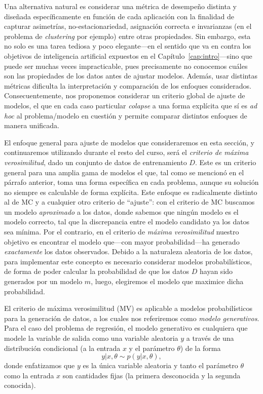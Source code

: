Una alternativa natural es considerar una métrica de desempeño distinta y diseñada específicamente en función  de cada aplicación con la finalidad de capturar asimetrías, no-estacionariedad, asignación correcta e invarianzas (en el problema de \emph{clustering} por ejemplo) entre otras propiedades. Sin embargo, esta no solo es una tarea tediosa y poco elegante---en el sentido que va en contra los objetivos de inteligencia artificial expuestos en el Capítulo~\ref{cap:intro}---sino que puede ser muchas veces impracticable, pues precisamente no conocemos cuáles son las propiedades de los datos antes de ajustar modelos. Además, usar distintas métricas dificulta la interpretación y comparación de los enfoques considerados. Consecuentemente, nos proponemos considerar un criterio global de ajuste de modelos, el que en cada caso particular \emph{colapse} a una forma explícita que sí es \emph{ad hoc} al problema/modelo en cuestión y permite comparar distintos enfoques de manera unificada. 	

El enfoque general para ajuste de modelos que consideraremos en esta sección, y continuaremos utilizando durante el resto del curso, será el \emph{criterio  de máxima verosimilitud}, dado un conjunto de datos de entrenamiento $D$. Este es un criterio general para una amplia gama de modelos el que, tal como se mencionó en el párrafo anterior, toma una  forma específica en cada problema, aunque su solución no siempre es calculable de forma explícita. Este enfoque es radicalmente distinto al de MC y a cualquier otro criterio de ``ajuste'': con el criterio de MC buscamos un modelo \emph{aproximado} a los datos, donde sabemos que ningún modelo es el modelo correcto, tal que la discrepancia entre el modelo candidato ya los datos sea mínima. Por el contrario, en el criterio de \emph{máxima verosimilitud} nuestro objetivo es encontrar el modelo que---con mayor probabilidad---ha generado \emph{exactamente} los datos observados. Debido a la naturaleza aleatoria de los datos, para implementar este concepto es necesario considerar modelos probabilísticos, de forma de poder calcular la probabilidad de que los datos $D$ hayan sido generados por un modelo $m$, luego, elegiremos  el modelo que maximice dicha probabilidad. 

El criterio de máxima verosimilitud (MV) es aplicable a modelos probabilísticos para la generación de datos, a los cuales nos referiremos como \emph{modelo generativos}. Para el caso del problema de regresión, el modelo generativo es cualquiera que modele la variable de salida como una variable aleatoria $y$ a través de una distribución condicional (a la entrada $x$ y el parámetro $\theta$) de la forma 
\begin{equation}
	y|x,\theta \sim p(y|x,\theta),\label{eq:mod_gen}
\end{equation}
donde enfatizamos que $y$ es  la única variable aleatoria y tanto el parámetro $\theta$ como la entrada $x$ son cantidades fijas (la primera desconocida y la segunda conocida).

